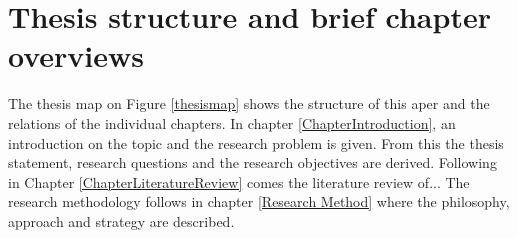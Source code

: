 











\section{Thesis structure and brief chapter overviews}

The thesis map on Figure \ref{thesismap} shows the structure of this aper and the relations of the individual chapters. \newline
In chapter \ref{ChapterIntroduction}, an introduction on the topic and the research problem is given. From this the thesis statement, research questions and the research objectives are derived. Following in Chapter \ref{ChapterLiteratureReview} comes the literature review of...
The research methodology follows in chapter \ref{Research Method} where the philosophy, approach and strategy are described.






